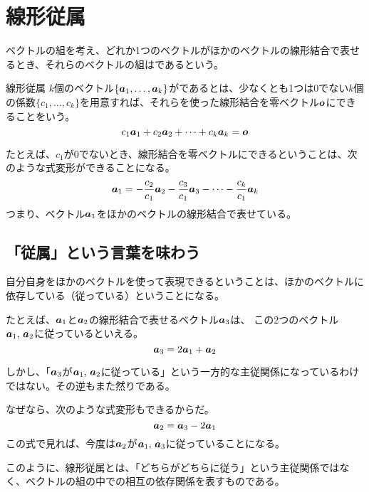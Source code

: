 \documentclass[../../../topic_linear-algebra]{subfiles}
\begin{document}
\sectionline
\section{線形従属}

ベクトルの組を考え、どれか1つのベクトルがほかのベクトルの線形結合で表せるとき、それらのベクトルの組はであるという。

\begin{definition}{線形従属}
  $k$個のベクトル$\{ \vb*{a}_1, \ldots, \vb*{a}_k \}$がであるとは、少なくとも1つは$0$でない$k$個の係数$\{c_1, \ldots, c_k\}$を用意すれば、それらを使った線形結合を零ベクトル$\vb*{o}$にできることをいう。
  \begin{equation*}
    c_1 \vb*{a}_1 + c_2 \vb*{a}_2 + \cdots + c_k\vb*{a}_{k} = \vb*{o}
  \end{equation*}
\end{definition}

たとえば、$c_1$が$0$でないとき、線形結合を零ベクトルにできるということは、次のような式変形ができることになる。
\begin{equation*}
  \vb*{a}_1 = -\frac{c_2}{c_1} \vb*{a}_2 - \frac{c_3}{c_1} \vb*{a}_3 - \cdots - \frac{c_k}{c_1} \vb*{a}_{k}
\end{equation*}
つまり、ベクトル$\vb*{a}_1$をほかのベクトルの線形結合で表せている。

\subsection{「従属」という言葉を味わう}

自分自身をほかのベクトルを使って表現できるということは、ほかのベクトルに依存している（従っている）ということになる。

\br

たとえば、$\vb*{a}_1$と$\vb*{a}_2$の線形結合で表せるベクトル$\vb*{a}_3$は、 この2つのベクトル$\vb*{a}_1 ,\, \vb*{a}_2$に従っているといえる。
\begin{equation*}
  \vb*{a}_3 = 2 \vb*{a}_1 + \vb*{a}_2
\end{equation*}

しかし、「$\vb*{a}_3$が$\vb*{a}_1 ,\, \vb*{a}_2$に従っている」という一方的な主従関係になっているわけではない。その逆もまた然りである。

なぜなら、次のような式変形もできるからだ。
\begin{equation*}
  \vb*{a}_2 = \vb*{a}_3 - 2 \vb*{a}_1
\end{equation*}
この式で見れば、今度は$\vb*{a}_2$が$\vb*{a}_1 ,\, \vb*{a}_3$に従っていることになる。

\br

このように、線形従属とは、「どちらがどちらに従う」という主従関係ではなく、ベクトルの組の中での相互の依存関係を表すものである。
\end{document}
